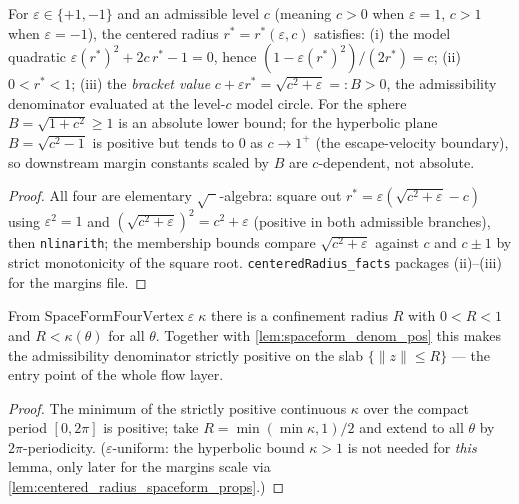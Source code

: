 \begin{lemma}
  \label{lem:centered_radius_spaceform_props}
  For $\varepsilon\in\{+1,-1\}$ and an admissible level $c$ (meaning $c>0$
  when $\varepsilon=1$, $c>1$ when $\varepsilon=-1$), the centered radius
  $r^\ast=r^\ast(\varepsilon,c)$ satisfies:
  (i) the model quadratic $\varepsilon (r^\ast)^2+2c\,r^\ast-1=0$, hence
  $(1-\varepsilon (r^\ast)^2)/(2r^\ast)=c$;
  (ii) $0<r^\ast<1$;
  (iii) the \emph{bracket value}
  $c+\varepsilon r^\ast=\sqrt{c^2+\varepsilon}=:B>0$, the admissibility
  denominator evaluated at the level-$c$ model circle. For the sphere
  $B=\sqrt{1+c^2}\ge1$ is an absolute lower bound; for the hyperbolic plane
  $B=\sqrt{c^2-1}$ is positive but tends to $0$ as $c\to1^{+}$ (the
  escape-velocity boundary), so downstream margin constants scaled by $B$ are
  $c$-dependent, not absolute.
\end{lemma}

\begin{proof}
  \leanok
  All four are elementary $\sqrt{\phantom{x}}$-algebra: square out
  $r^\ast=\varepsilon(\sqrt{c^2+\varepsilon}-c)$ using $\varepsilon^2=1$ and
  $(\sqrt{c^2+\varepsilon})^2=c^2+\varepsilon$ (positive in both admissible
  branches), then \texttt{nlinarith}; the membership bounds compare
  $\sqrt{c^2+\varepsilon}$ against $c$ and $c\pm1$ by strict monotonicity of
  the square root. \texttt{centeredRadius\_facts} packages (ii)--(iii) for the
  margins file.
\end{proof}

\begin{lemma}
  \label{lem:spaceform_admissible_lower_bound}
  From $\mathrm{SpaceFormFourVertex}\;\varepsilon\;\kappa$ there is a
  confinement radius $R$ with $0<R<1$ and $R<\kappa(\theta)$ for all
  $\theta$. Together with \cref{lem:spaceform_denom_pos} this makes the
  admissibility denominator strictly positive on the slab
  $\{\|z\|\le R\}$ — the entry point of the whole flow layer.
\end{lemma}

\begin{proof}
  \leanok
  The minimum of the strictly positive continuous $\kappa$ over the compact
  period $[0,2\pi]$ is positive; take $R=\min(\min\kappa,1)/2$ and extend to
  all $\theta$ by $2\pi$-periodicity. ($\varepsilon$-uniform: the hyperbolic
  bound $\kappa>1$ is not needed for \emph{this} lemma, only later for the
  margins scale via \cref{lem:centered_radius_spaceform_props}.)
\end{proof}

